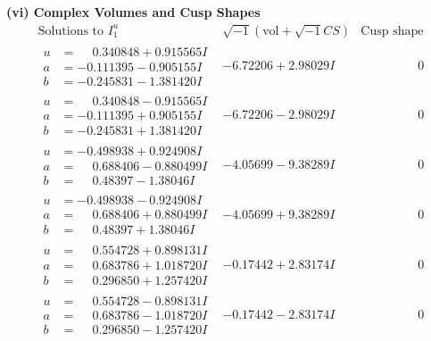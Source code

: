 \documentclass[1p]{elsarticle_modified}
\theoremstyle{definition}
\newcommand{\I}{\sqrt{-1}}
\begin{document}
\newpage\flushleft \textbf{(vi) Complex Volumes and Cusp Shapes}
$$\begin{array}{c|c|c}  
\text{Solutions to }I^u_{1}& \I (\text{vol} + \sqrt{-1}CS) & \text{Cusp shape}\\
 \hline 
\begin{aligned}
u &= \phantom{-}0.340848 + 0.915565 I \\
a &= -0.111395 - 0.905155 I \\
b &= -0.245831 - 1.381420 I\end{aligned}
 & -6.72206 + 2.98029 I & \phantom{-0.000000 } 0 \\ \hline\begin{aligned}
u &= \phantom{-}0.340848 - 0.915565 I \\
a &= -0.111395 + 0.905155 I \\
b &= -0.245831 + 1.381420 I\end{aligned}
 & -6.72206 - 2.98029 I & \phantom{-0.000000 } 0 \\ \hline\begin{aligned}
u &= -0.498938 + 0.924908 I \\
a &= \phantom{-}0.688406 - 0.880499 I \\
b &= \phantom{-}0.48397 - 1.38046 I\end{aligned}
 & -4.05699 - 9.38289 I & \phantom{-0.000000 } 0 \\ \hline\begin{aligned}
u &= -0.498938 - 0.924908 I \\
a &= \phantom{-}0.688406 + 0.880499 I \\
b &= \phantom{-}0.48397 + 1.38046 I\end{aligned}
 & -4.05699 + 9.38289 I & \phantom{-0.000000 } 0 \\ \hline\begin{aligned}
u &= \phantom{-}0.554728 + 0.898131 I \\
a &= \phantom{-}0.683786 + 1.018720 I \\
b &= \phantom{-}0.296850 + 1.257420 I\end{aligned}
 & -0.17442 + 2.83174 I & \phantom{-0.000000 } 0 \\ \hline\begin{aligned}
u &= \phantom{-}0.554728 - 0.898131 I \\
a &= \phantom{-}0.683786 - 1.018720 I \\
b &= \phantom{-}0.296850 - 1.257420 I\end{aligned}
 & -0.17442 - 2.83174 I & \phantom{-0.000000 } 0 \\ \hline\begin{aligned}

\end{aligned}
\end{array}$$
\end{document}
